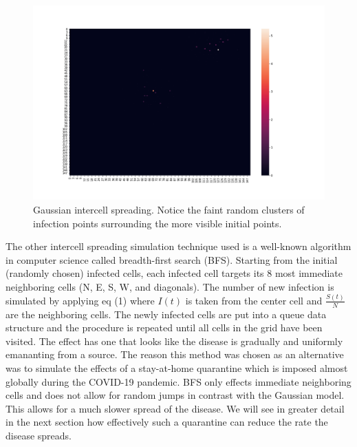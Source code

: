 \documentclass[a4paper]{article}
\begin{document}
\begin{figure}[ht]
  \includegraphics[scale=0.25]{../gaussian_spread/gaussian_spread_1.png}
  \centering
  \caption{Gaussian intercell spreading. Notice the faint random clusters of infection
    points surrounding the more visible initial points.}
\end{figure}

The other intercell spreading simulation technique used is a well-known algorithm 
in computer science called breadth-first search (BFS). Starting from the initial
(randomly chosen) infected cells, each infected cell targets its 8 most
immediate neighboring cells (N, E, S, W, and diagonals). 
The number of new infection is simulated by applying eq
(1) where $I(t)$ is taken from the center cell and $\frac{S(t)}{N}$ are the neighboring
cells. The newly infected cells are put into a queue data structure and the procedure is
repeated until all cells in the grid have been visited. The effect has one that
looks like the disease is gradually and uniformly emananting from a source. The reason this
method was chosen as an alternative was to simulate the effects of a
stay-at-home quarantine which is imposed almost globally during the COVID-19
pandemic. BFS only effects immediate neighboring cells and does not allow for
random jumps in contrast with the Gaussian model. This allows for a much slower
spread of the disease.
We will see in greater detail in the next section how effectively such
a quarantine can reduce the rate the disease spreads.
\end{document}
